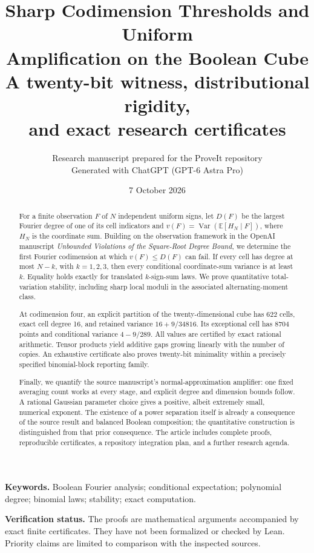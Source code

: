 \documentclass[11pt,a4paper]{article}
\title{\textbf{Sharp Codimension Thresholds and Uniform\\
Amplification on the Boolean Cube}\\[8pt]
\large A twenty-bit witness, distributional rigidity,\\
and exact research certificates}
\author{Research manuscript prepared for the ProveIt repository\\
\small Generated with ChatGPT (GPT-6 Astra Pro)}
\date{7 October 2026}
\newcommand{\E}{\mathbb E}
\newcommand{\1}{\mathbf 1}
\newcommand{\Var}{\operatorname{Var}}
\theoremstyle{definition}
\theoremstyle{remark}
\numberwithin{equation}{section}
\begin{document}
\maketitle
\begin{abstract}
For a finite observation \(F\) of \(N\) independent uniform signs, let
\(D(F)\) be the largest Fourier degree of one of its cell indicators and
\(v(F)=\Var(\E[H_N\mid F])\), where \(H_N\) is the coordinate sum.
Building on the observation framework in the OpenAI manuscript
\emph{Unbounded Violations of the Square-Root Degree Bound}, we determine
the first Fourier codimension at which \(v(F)\le D(F)\) can fail.
If every cell has degree at most \(N-k\), with \(k=1,2,3\), then every
conditional coordinate-sum variance is at least \(k\). Equality holds
exactly for translated \(k\)-sign-sum laws. We prove quantitative
total-variation stability, including sharp local moduli in the associated
alternating-moment class.

At codimension four, an explicit partition of the twenty-dimensional cube
has 622 cells, exact cell degree 16, and retained variance
\(16+9/34816\). Its exceptional cell has 8704 points and conditional
variance \(4-9/289\). All values are certified by exact rational
arithmetic. Tensor products yield additive gaps growing linearly with
the number of copies. An exhaustive certificate also proves twenty-bit
minimality within a precisely specified binomial-block reporting family.

Finally, we quantify the source manuscript's normal-approximation
amplifier: one fixed averaging count works at every stage, and explicit
degree and dimension bounds follow. A rational Gaussian parameter choice
gives a positive, albeit extremely small, numerical exponent. The
existence of a power separation itself is already a consequence of the
source result and balanced Boolean composition; the quantitative
construction is distinguished from that prior consequence.
The article includes complete proofs, reproducible certificates, a
repository integration plan, and a further research agenda.
\end{abstract}
\vspace{5pt}
\noindent\textbf{Keywords.}
Boolean Fourier analysis; conditional expectation; polynomial degree;
binomial laws; stability; exact computation.

\noindent\textbf{Verification status.}
The proofs are mathematical arguments accompanied by exact finite
certificates. They have not been formalized or checked by Lean.
Priority claims are limited to comparison with the inspected sources.
\clearpage
\begingroup
\small
\setlength{\parskip}{0pt}
\tableofcontents
\endgroup
\newpage










\end{document}
